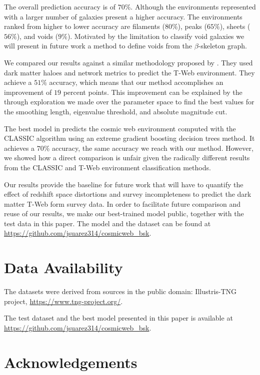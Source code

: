 \documentclass[usenatbib]{mnras}
\begin{document}
The overall prediction accuracy is of $70\%$. Although the environments represented with a larger number of galaxies present a higher accuracy. The environments ranked from higher to lower accuracy are filaments ($80\%$), peaks ($65\%$), sheets ($56\%$), and voids ($9\%$).  Motivated by the limitation to classify void galaxies we will present in future work a method to define voids from the $\beta$-skeleton graph. 

We compared our results against a similar methodology proposed by \cite{Tsizh2019}. They used dark matter haloes and network metrics to predict the T-Web environment.  They achieve a $51\%$ accuracy, which means that our method accomplishes an improvement of $19$ percent points.
This improvement can be explained by the through exploration we made over the parameter space to find the best values for
the smoothing length, eigenvalue threshold, and absolute magnitude cut.

The best model in \cite{Tsizh2019} predicts the cosmic web environment computed with the CLASSIC algorithm using an extreme gradient boosting decision trees method. 
It achieves a $70\%$ accuracy, the same accuracy we reach with our method. 
However, we showed how a direct comparison is unfair given the radically different results from the CLASSIC and T-Web environment classification methods.

Our results provide the baseline for future work that will have to quantify the effect of redshift space distortions and survey incompleteness to predict the dark matter T-Web form survey data.
In order to facilitate future comparison and reuse of our results, we make our best-trained model public, together with the test data in this paper.
The model and the dataset can be found at \url{https://github.com/jsuarez314/cosmicweb_bsk}.

\section*{Data Availability}

The datasets were derived from sources in the public domain: Illustris-TNG project, \url{https://www.tng-project.org/}.

The test dataset and the best model presented in this paper is available at \url{https://github.com/jsuarez314/cosmicweb_bsk}.

\section*{Acknowledgements}
\end{document}
